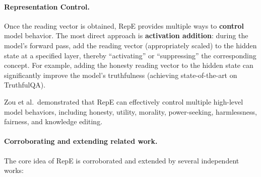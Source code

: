 \paragraph{Representation Control.}
Once the reading vector is obtained, RepE provides multiple ways to \textbf{control} model behavior.
The most direct approach is \textbf{activation addition}:
during the model's forward pass, add the reading vector (appropriately scaled) to the hidden state at a specified layer,
thereby ``activating'' or ``suppressing'' the corresponding concept.
For example, adding the honesty reading vector to the hidden state can significantly improve the model's truthfulness
(achieving state-of-the-art on TruthfulQA).

Zou et al.\ demonstrated that RepE can effectively control multiple high-level model behaviors,
including honesty, utility, morality, power-seeking,
harmlessness, fairness, and knowledge editing.

\paragraph{Corroborating and extending related work.}
The core idea of RepE is corroborated and extended by several independent works:

